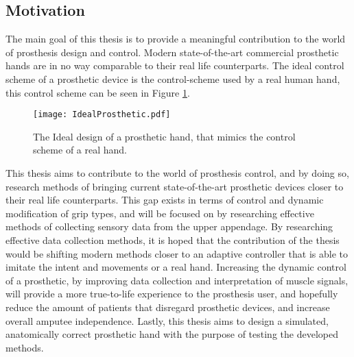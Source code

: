 \documentclass[../main.tex]{subfiles}
\begin{document}
\subsection{Motivation}

The main goal of this thesis is to provide a meaningful contribution to the world of prosthesis design and control.
Modern state-of-the-art commercial prosthetic hands are in no way comparable to their real life counterparts.
The ideal control scheme of a prosthetic device is the control-scheme used by a real human hand, this control scheme can be seen in Figure \ref{fig:idealprosthetic}.

\begin{figure}[h]
\begin{center}
\texttt{[image: IdealProsthetic.pdf]}
\caption{The Ideal design of a prosthetic hand, that mimics the control scheme of a real hand.}
\label{fig:idealprosthetic}
\end{center}
\end{figure}


This thesis aims to contribute to the world of prosthesis control, and by doing so, research methods of bringing current state-of-the-art prosthetic devices closer to their real life counterparts.
This gap exists in terms of control and dynamic modification of grip types, and will be focused on by researching effective methods of collecting sensory data from the upper appendage.
By researching effective data collection methods, it is hoped that the contribution of the thesis would be shifting modern methods closer to an adaptive controller that is able to imitate the intent and movements or a real hand.
Increasing the dynamic control of a prosthetic, by improving data collection and interpretation of  muscle signals, will provide a more true-to-life experience to the prosthesis user, and hopefully reduce the amount of patients that disregard prosthetic devices, and increase overall amputee independence.
Lastly, this thesis aims to design a simulated, anatomically correct prosthetic hand with the purpose of testing the developed methods.
\end{document}
